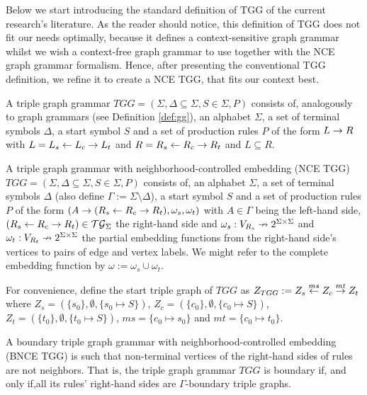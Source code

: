 \documentclass[]{report}
\begin{document}
Below we start introducing the standard definition of TGG of the current research's literature. As the reader should notice, this definition of TGG does not fit our needs optimally, because it defines a context-sensitive graph grammar whilst we wish a context-free graph grammar to use together with the NCE graph grammar formalism. Hence, after presenting the conventional TGG definition, we refine it to create a NCE TGG, that fits our context best.

\begin{definition}
	\label{def:stgg}
	A triple graph grammar $TGG = (\Sigma, \Delta \subseteq \Sigma, S \in \Sigma, P)$ consists of, analogously to graph grammars (see Definition \ref{def:gg}), an alphabet $\Sigma$, a set of terminal symbols $\Delta$, a start symbol $S$ and a set of production rules $P$ of the form $L \to R$ with $L = L_s \overset{}{\leftarrow} L_c \overset{}{\rightarrow} L_t$ and $R = R_s \overset{}{\leftarrow} R_c \overset{}{\rightarrow} R_t$ and $L \subseteq R.$
\end{definition}

\begin{definition}
	A triple graph grammar with neighborhood-controlled embedding (NCE TGG) $TGG = (\Sigma, \Delta \subseteq \Sigma, S \in \Sigma, P)$ consists of, an alphabet $\Sigma$, a set of terminal symbols $\Delta$ (also define $\Gamma := \Sigma \setminus \Delta$), a start symbol $S$ and a set of production rules $P$ of the form $(A \to (R_s \overset{}{\leftarrow} R_c \overset{}{\rightarrow} R_t), \omega_s, \omega_t)$ with $A \in \Gamma$ being the left-hand side, $(R_s \overset{}{\leftarrow} R_c \overset{}{\rightarrow} R_t) \in \mathcal{TG}_{\Sigma}$ the right-hand side and $\omega_s : V_{R_s} \nrightarrow 2^{\Sigma \times \Sigma}$ and $\omega_t : V_{R_t} \nrightarrow 2^{\Sigma \times \Sigma}$ the partial embedding functions from the right-hand side's vertices to pairs of edge and vertex labels. We might refer to the complete embedding function by $\omega:= \omega_s \cup \omega_t$.
	
	For convenience, define the start triple graph of $TGG$ as $Z_{TGG} := Z_s \overset{ms}{\leftarrow} Z_c \overset{mt}{\rightarrow} Z_t$ where $Z_s = (\{s_0\},\emptyset,\{s_0 \mapsto S\})$, $Z_c = (\{c_0\},\emptyset,\{c_0 \mapsto S\})$, $Z_t = (\{t_0\},\emptyset,\{t_0 \mapsto S\})$, $ms = \{c_0 \mapsto s_0 \}$ and $mt = \{c_0 \mapsto t_0 \}$.
	
	
\end{definition}

\begin{definition}
	A boundary triple graph grammar with neighborhood-controlled embedding (BNCE TGG) is such that non-terminal vertices of the right-hand sides of rules are not neighbors. That is, the triple graph grammar $TGG$ is boundary if, and only if,all its rules' right-hand sides are $\Gamma\text{-boundary}$ triple graphs.
\end{definition}
\end{document}
